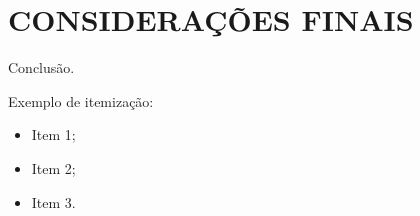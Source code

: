 
\chapter{CONSIDERAÇÕES FINAIS}
\label{chap:conclusao}

Conclusão.

Exemplo de itemização:

\begin{itemize}
	\item Item 1;
	\item Item 2;
	\item Item 3.
\end{itemize}
